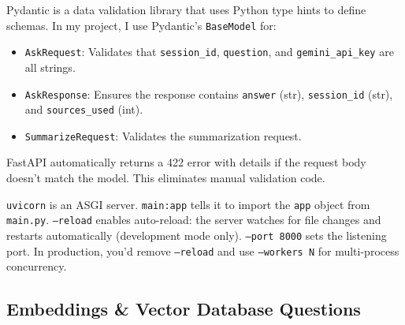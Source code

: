 \documentclass[12pt,a4paper]{article}
\begin{document}
\begin{interviewbox}
\end{interviewbox}
\begin{answerbox}
Pydantic is a data validation library that uses Python type hints to define schemas. In my project, I use Pydantic's \texttt{BaseModel} for:
\begin{itemize}
  \item \texttt{AskRequest}: Validates that \texttt{session\_id}, \texttt{question}, and \texttt{gemini\_api\_key} are all strings.
  \item \texttt{AskResponse}: Ensures the response contains \texttt{answer} (str), \texttt{session\_id} (str), and \texttt{sources\_used} (int).
  \item \texttt{SummarizeRequest}: Validates the summarization request.
\end{itemize}
FastAPI automatically returns a 422 error with details if the request body doesn't match the model. This eliminates manual validation code.
\end{answerbox}

\begin{interviewbox}
\end{interviewbox}
\begin{answerbox}
\texttt{uvicorn} is an ASGI server. \texttt{main:app} tells it to import the \texttt{app} object from \texttt{main.py}. \texttt{--reload} enables auto-reload: the server watches for file changes and restarts automatically (development mode only). \texttt{--port 8000} sets the listening port. In production, you'd remove \texttt{--reload} and use \texttt{--workers N} for multi-process concurrency.
\end{answerbox}

\subsection{Embeddings \& Vector Database Questions}
\end{document}

